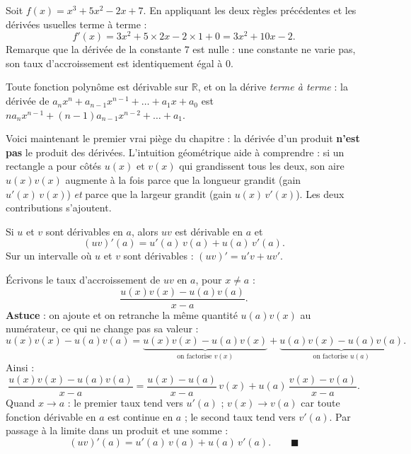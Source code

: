\documentclass[11pt]{article}
\newcounter{popsec}
\newcounter{popsub}
\newcommand{\courssub}[1]{%
  \stepcounter{popsub}%
  \par\vspace{9pt}\noindent{\popxbold\fontsize{11.5}{13}\selectfont\color{popink}{\color{poporange}\thepopsec.\thepopsub}\hspace{6pt}#1}\par\nopagebreak\vspace{4pt}
}
\begin{document}
\begin{exemplebox}
Soit $f(x) = x^3 + 5x^2 - 2x + 7$. En appliquant les deux règles précédentes et les dérivées usuelles terme à terme :
\[
f'(x) = 3x^2 + 5\times 2x - 2\times 1 + 0 = 3x^2 + 10x - 2.
\]
Remarque que la dérivée de la constante $7$ est nulle : une constante ne varie pas, son taux d'accroissement est identiquement égal à $0$.
\end{exemplebox}

\begin{aretenir}
Toute fonction polynôme est dérivable sur $\mathbb{R}$, et on la dérive \emph{terme à terme} : la dérivée de $a_nx^n + a_{n-1}x^{n-1} + \dots + a_1x + a_0$ est $na_nx^{n-1} + (n-1)a_{n-1}x^{n-2} + \dots + a_1$.
\end{aretenir}

\courssub{Dérivée d'un produit}

Voici maintenant le premier vrai piège du chapitre : la dérivée d'un produit \textbf{n'est pas} le produit des dérivées. L'intuition géométrique aide à comprendre : si un rectangle a pour côtés $u(x)$ et $v(x)$ qui grandissent tous les deux, son aire $u(x)v(x)$ augmente à la fois parce que la longueur grandit (gain $u'(x)\,v(x)$) \emph{et} parce que la largeur grandit (gain $u(x)\,v'(x)$). Les deux contributions s'ajoutent.

\begin{propriete}
Si $u$ et $v$ sont dérivables en $a$, alors $uv$ est dérivable en $a$ et
\[
(uv)'(a) = u'(a)\,v(a) + u(a)\,v'(a).
\]
Sur un intervalle où $u$ et $v$ sont dérivables : $(uv)' = u'v + uv'$.
\end{propriete}

\begin{experience}
Écrivons le taux d'accroissement de $uv$ en $a$, pour $x \neq a$ :
\[
\frac{u(x)v(x)-u(a)v(a)}{x-a}.
\]
\textbf{Astuce} : on ajoute et on retranche la même quantité $u(a)v(x)$ au numérateur, ce qui ne change pas sa valeur :
\[
u(x)v(x)-u(a)v(a) = \underbrace{u(x)v(x)-u(a)v(x)}_{\text{on factorise } v(x)} + \underbrace{u(a)v(x)-u(a)v(a)}_{\text{on factorise } u(a)}.
\]
Ainsi :
\[
\frac{u(x)v(x)-u(a)v(a)}{x-a} = \frac{u(x)-u(a)}{x-a}\,v(x) + u(a)\,\frac{v(x)-v(a)}{x-a}.
\]
Quand $x \to a$ : le premier taux tend vers $u'(a)$ ; $v(x) \to v(a)$ car toute fonction dérivable en $a$ est continue en $a$ ; le second taux tend vers $v'(a)$. Par passage à la limite dans un produit et une somme :
\[
(uv)'(a) = u'(a)\,v(a) + u(a)\,v'(a). \qquad \blacksquare
\]
\end{experience}
\end{document}
